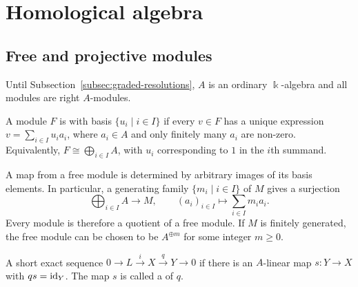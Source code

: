 \clearpage
\section{Homological algebra}\label{sec:minimal-resolutions}


\subsection{Free and projective modules}

Until Subsection~\ref{subsec:graded-resolutions}, $A$ is an ordinary $\Bbbk$-algebra and all modules are right $A$-modules.

\begin{definition}\label{def:free-module}
A module $F$ is  with basis $\{u_i\mid i\in I\}$ if every $v\in F$ has a unique expression $v=\sum_{i\in I}u_i a_i$, where $a_i\in A$ and only finitely many $a_i$ are non-zero.
Equivalently, $F\cong\bigoplus_{i\in I}A$, with $u_i$ corresponding to $1$ in the $i$th summand.
\end{definition}

A map from a free module is determined by arbitrary images of its basis elements.
In particular, a generating family $\{m_i\mid i\in I\}$ of $M$ gives a surjection
\[
\bigoplus_{i\in I}A\longrightarrow M,\qquad
(a_i)_{i\in I}\longmapsto\sum_{i\in I}m_i a_i.
\]
Every module is therefore a quotient of a free module. If $M$ is finitely generated, the free module can be chosen to be $A^{\oplus m}$ for some integer $m\geq0$.

\begin{definition}\label{def:split-sequence}
A short exact sequence $0\to L\xrightarrow{i}X\xrightarrow{q}Y\to0$  if there is an $A$-linear map $s:Y\to X$ with $qs=\operatorname{id}_Y$.
The map $s$ is called a  of $q$.
\end{definition}

